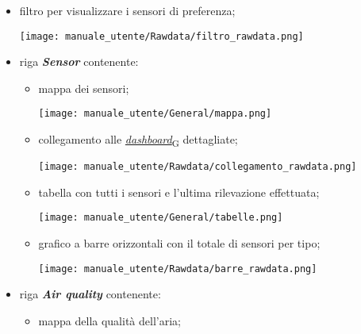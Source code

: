 \begin{itemize}
    \item filtro per visualizzare i sensori di preferenza;
    \begin{center}
        \texttt{[image: manuale\_utente/Rawdata/filtro\_rawdata.png]}
    \end{center} 
    \item riga \textit{\textbf{Sensor}} contenente:
    \begin{itemize}
        \item mappa dei sensori;
        \begin{center}
            \texttt{[image: manuale\_utente/General/mappa.png]}
        \end{center} 
        \item collegamento alle \href{https://7last.github.io/docs/pb/documentazione-interna/glossario\#dashboard}{\textit{dashboard}\textsubscript{G}} dettagliate;
        \begin{center}
            \texttt{[image: manuale\_utente/Rawdata/collegamento\_rawdata.png]}
        \end{center} 
        \item tabella con tutti i sensori e l'ultima rilevazione effettuata;
        \begin{center}
            \texttt{[image: manuale\_utente/General/tabelle.png]}
        \end{center} 
        \item grafico a barre orizzontali con il totale di sensori per tipo;
        \begin{center}
            \texttt{[image: manuale\_utente/Rawdata/barre\_rawdata.png]}
        \end{center} 
    \end{itemize}
    \newpage
    \item riga \textit{\textbf{Air quality}} contenente:
    \begin{itemize}
        \item mappa della qualità dell'aria;

\end{itemize}
\end{itemize}
